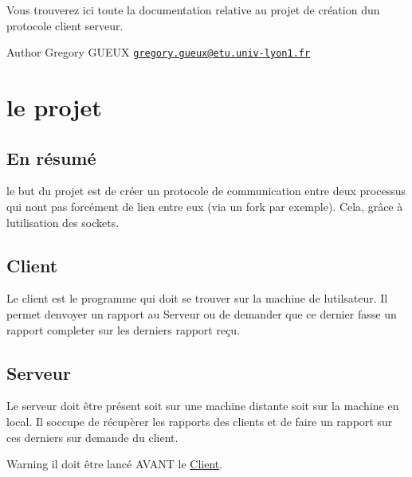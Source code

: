 Vous trouverez ici toute la documentation relative au projet de création d\textquotesingle{}un protocole client serveur.\begin{DoxyAuthor}{Author}
Gregory G\+U\+E\+U\+X \href{mailto:gregory.gueux@etu.univ-lyon1.fr}{\tt gregory.\+gueux@etu.\+univ-\/lyon1.\+fr}
\end{DoxyAuthor}
\hypertarget{index_sec1}{}\section{le projet}\label{index_sec1}
\hypertarget{index_sub11}{}\subsection{En résumé}\label{index_sub11}
le but du projet est de créer un protocole de communication entre deux processus qui n\textquotesingle{}ont pas forcément de lien entre eux (via un fork par exemple). Cela, grâce à l\textquotesingle{}utilisation des sockets.\hypertarget{index_sub12}{}\subsection{Client}\label{index_sub12}
Le client est le programme qui doit se trouver sur la machine de l\textquotesingle{}utilsateur. Il permet d\textquotesingle{}envoyer un rapport au Serveur ou de demander que ce dernier fasse un rapport completer sur les derniers rapport reçu.\hypertarget{index_sub13}{}\subsection{Serveur}\label{index_sub13}
Le serveur doit être présent soit sur une machine distante soit sur la machine en local. Il s\textquotesingle{}occupe de récupèrer les rapports des clients et de faire un rapport sur ces derniers sur demande du client. \begin{DoxyWarning}{Warning}
il doit être lancé A\+V\+A\+N\+T le \hyperlink{group__client}{Client}. 
\end{DoxyWarning}
